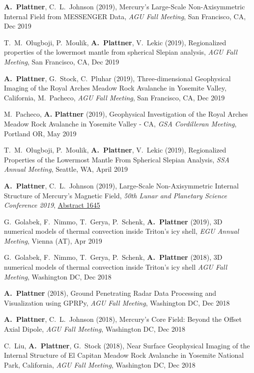 \documentclass[10pt]{article}
\begin{document}
\spcp \textbf{A.~Plattner}, C.~L.~Johnson (2019), Mercury's
Large-Scale Non-Axisymmetric Internal Field from MESSENGER Data,
\emph{AGU Fall Meeting}, San Francisco, CA, Dec 2019

\spcp T.~M.~Olugboji, P.~Moulik, \textbf{A.~Plattner}, V.~Lekic (2019),
Regionalized properties of the lowermost mantle from spherical Slepian analysis,
\emph{AGU Fall Meeting}, San Francisco, CA, Dec 2019

\spcp \textbf{A.~Plattner}, G.~Stock, C.~Pluhar (2019),
Three-dimensional Geophysical Imaging of the Royal Arches Meadow Rock
Avalanche in Yosemite Valley, California, M.~Pacheco, \emph{AGU Fall
Meeting}, San Francisco, CA, Dec 2019

\spcp M.~Pacheco, \textbf{A. Plattner} (2019), Geophysical
Investigation of the Royal Arches Meadow Rock Avalanche in Yosemite
Valley - CA, \emph{GSA Cordilleran Meeting}, Portland OR, May 2019

\spcp T.~M.~Olugboji, P.~Moulik, \textbf{A.~Plattner}, V.~Lekic
(2019), Regionalized Properties of the Lowermost Mantle From Spherical
Slepian Analysis, \emph{SSA Annual Meeting}, Seattle, WA, April 2019

\spcp
\textbf{A.~Plattner}, C.~L.~Johnson (2019), Large-Scale Non-Axisymmetric Internal Structure of Mercury's Magnetic Field,
\emph{50th Lunar and Planetary Science Conference 2019},
\href{https://www.hou.usra.edu/meetings/lpsc2019/pdf/1645.pdf}{Abstract 1645}

\spcp G.~Golabek, F.~Nimmo, T.~Gerya, P.~Schenk, \textbf{A.~Plattner}
(2019), 3D numerical models of thermal convection inside Triton’s icy
shell, \emph{EGU Annual Meeting}, Vienna (AT), Apr 2019

\spcp G.~Golabek, F.~Nimmo, T.~Gerya, P.~Schenk, \textbf{A.~Plattner} (2018),
3D numerical models of thermal convection inside Triton's icy shell
\emph{AGU Fall Meeting}, Washington DC, Dec 2018

\spcp \textbf{A.~Plattner} (2018),
Ground Penetrating Radar Data Processing and Visualization using
GPRPy,
\emph{AGU Fall Meeting}, Washington DC, Dec 2018

\spcp \textbf{A.~Plattner}, C.~L.~Johnson (2018), 
Mercury's Core Field: Beyond the Offset Axial Dipole,
\emph{AGU Fall Meeting}, Washington DC, Dec 2018 


\spcp
C.~Liu, \textbf{A.~Plattner}, G.~Stock (2018),
Near Surface Geophysical Imaging of the Internal
Structure of El Capitan Meadow Rock Avalanche in Yosemite National
Park, California,
\emph{AGU Fall Meeting}, Washington DC, Dec 2018
\end{document}
